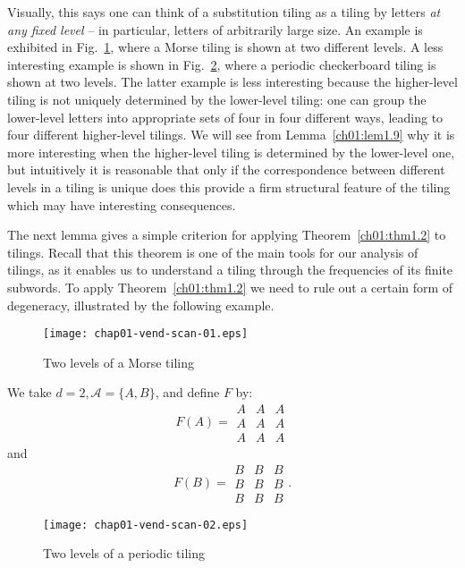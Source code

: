 \documentclass[reqno]{stml-l}
\theoremstyle{plain}
\theoremstyle{definition}
\numberwithin{equation}{chapter}
\begin{document}
Visually, this says one can think of a substitution tiling as a tiling by letters \emph{at any fixed level} -- in particular, letters of arbitrarily large size. An example is exhibited in Fig.~\ref{ch01:fig14}, where a Morse tiling is shown at two different levels. A less interesting example is shown in Fig.~\ref{ch01:fig15}, where a periodic checkerboard tiling is shown at two levels. The latter example is less interesting because the higher-level tiling is not uniquely determined by the lower-level tiling: one can group the lower-level letters into appropriate sets of four in four different ways, leading to four different higher-level tilings. We will see from Lemma~\ref{ch01:lem1.9} why it is more interesting when the higher-level tiling is determined by the lower-level one, but intuitively it is reasonable that only if the correspondence between different levels in a tiling is unique does this provide a firm structural feature of the tiling which may have interesting consequences.

The next lemma gives a simple criterion for applying Theorem~\ref{ch01:thm1.2} to tilings. Recall that this theorem is one of the main tools for our analysis of tilings, as it enables us to understand a tiling through the frequencies of its finite subwords. To apply Theorem~\ref{ch01:thm1.2} we need
to rule out a certain form of degeneracy, illustrated by the following example.

\begin{figure}[h]
\texttt{[image: chap01-vend-scan-01.eps]}
\caption{Two levels of a Morse tiling}
\label{ch01:fig14}
\end{figure}

We take $d=2,\mathcal{A}=\{A, B\}$, and define $F$ by:
\begin{equation}\label{ch01:eqn1.13}
F(A)=\begin{matrix}
A & A & A \\
A & A & A \\
A & A & A  \end{matrix}
\end{equation}
and
\begin{equation}
F(B)=\begin{matrix}
B & B & B \\ B & B & B \\ B & B & B
\end{matrix}. \label{ch01:eqn1.14}
\end{equation}

\begin{figure}[h]
\texttt{[image: chap01-vend-scan-02.eps]}
\caption{Two levels of a periodic tiling}
\label{ch01:fig15}
\end{figure}
\end{document}
